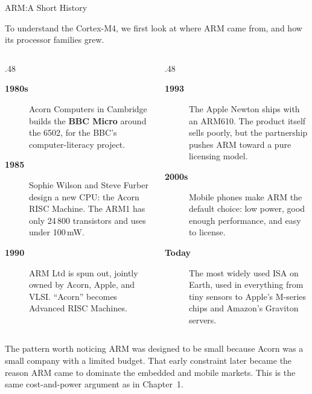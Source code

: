 \documentclass[9pt,aspectratio=169,xcolor=table]{beamer}
\begin{document}
{\beamerextras
\begin{frame}{ARM:}{A Short History}
    {\small\centering To understand the Cortex-M4, we first look at where ARM came from, and how its processor families grew.\par}
    \vspace{2mm}
    \small
    \begin{columns}[T]
    \begin{column}{.48\textwidth}
        \begin{description}
            \item [\textbf{1980s}]  Acorn Computers in Cambridge builds the \textbf{BBC Micro} around the 6502, for the BBC's computer-literacy project.
            \item [\textbf{1985}]  Sophie Wilson and Steve Furber design a new CPU: the \alert{Acorn RISC Machine}. The ARM1 has only 24\,800 transistors and uses under 100\,mW.
            \item [\textbf{1990}]  ARM Ltd is spun out, jointly owned by Acorn, Apple, and VLSI. ``Acorn'' becomes \alert{Advanced RISC Machines}.
        \end{description}
    \end{column}
    \begin{column}{.48\textwidth}
        \begin{description}
            \item [\textbf{1993}]  The Apple Newton ships with an ARM610. The product itself sells poorly, but the partnership pushes ARM toward a pure licensing model.
            \item [\textbf{2000s}]  Mobile phones make ARM the default choice: low power, good enough performance, and easy to license.
            \item [\textbf{Today}]  The most widely used ISA on Earth, used in everything from tiny sensors to Apple's M-series chips and Amazon's Graviton servers.
        \end{description}
    \end{column}
    \end{columns}
    \vspace{2mm}
    \begin{block}{The pattern worth noticing}
        ARM was designed to be small because Acorn was a small company with a limited budget. That early constraint later became the reason ARM came to dominate the embedded and mobile markets. This is the same cost-and-power argument as in Chapter~1.
    \end{block}
\end{frame}
}
\end{document}
